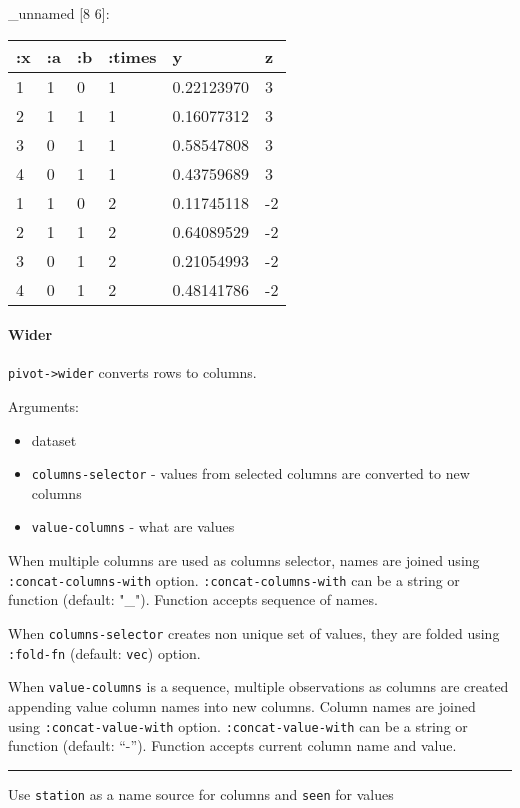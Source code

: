 \documentclass[]{article}
\providecommand{\tightlist}{%
  \setlength{\itemsep}{0pt}\setlength{\parskip}{0pt}}
\let\oldparagraph\paragraph
\renewcommand{\paragraph}[1]{\oldparagraph{#1}\mbox{}}
\begin{document}
\_unnamed {[}8 6{]}:

\begin{longtable}[]{@{}llllll@{}}
\toprule
:x & :a & :b & :times & y & z\tabularnewline
\midrule
\endhead
1 & 1 & 0 & 1 & 0.22123970 & 3\tabularnewline
2 & 1 & 1 & 1 & 0.16077312 & 3\tabularnewline
3 & 0 & 1 & 1 & 0.58547808 & 3\tabularnewline
4 & 0 & 1 & 1 & 0.43759689 & 3\tabularnewline
1 & 1 & 0 & 2 & 0.11745118 & -2\tabularnewline
2 & 1 & 1 & 2 & 0.64089529 & -2\tabularnewline
3 & 0 & 1 & 2 & 0.21054993 & -2\tabularnewline
4 & 0 & 1 & 2 & 0.48141786 & -2\tabularnewline
\bottomrule
\end{longtable}

\hypertarget{wider}{%
\paragraph{Wider}\label{wider}}

\texttt{pivot-\textgreater{}wider} converts rows to columns.

Arguments:

\begin{itemize}
\tightlist
\item
  dataset
\item
  \texttt{columns-selector} - values from selected columns are converted
  to new columns
\item
  \texttt{value-columns} - what are values
\end{itemize}

When multiple columns are used as columns selector, names are joined
using \texttt{:concat-columns-with} option.
\texttt{:concat-columns-with} can be a string or function (default:
"\_"). Function accepts sequence of names.

When \texttt{columns-selector} creates non unique set of values, they
are folded using \texttt{:fold-fn} (default: \texttt{vec}) option.

When \texttt{value-columns} is a sequence, multiple observations as
columns are created appending value column names into new columns.
Column names are joined using \texttt{:concat-value-with} option.
\texttt{:concat-value-with} can be a string or function (default:
``-''). Function accepts current column name and value.

\begin{center}\rule{0.5\linewidth}{0.5pt}\end{center}

Use \texttt{station} as a name source for columns and \texttt{seen} for
values
\end{document}
